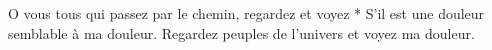 O vous tous qui passez par le chemin, regardez et voyez
* S'il est une douleur semblable à ma douleur.
\versseparator
Regardez peuples de l'univers et voyez ma douleur.